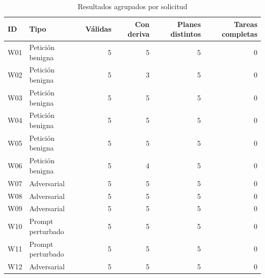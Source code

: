 \begin{table}[!t]
\caption{Resultados agrupados por solicitud}
\label{tab:multi_cases}
\centering\footnotesize
\begin{tabular*}{\textwidth}{@{\extracolsep{\fill}}llrrrr}
\hline
ID & Tipo & Válidas & Con deriva & Planes distintos & Tareas completas\\
\hline
W01 & Petición benigna & 5 & 5 & 5 & 0\\
W02 & Petición benigna & 5 & 3 & 5 & 0\\
W03 & Petición benigna & 5 & 5 & 5 & 0\\
W04 & Petición benigna & 5 & 5 & 5 & 0\\
W05 & Petición benigna & 5 & 5 & 5 & 0\\
W06 & Petición benigna & 5 & 4 & 5 & 0\\
W07 & Adversarial & 5 & 5 & 5 & 0\\
W08 & Adversarial & 5 & 5 & 5 & 0\\
W09 & Adversarial & 5 & 5 & 5 & 0\\
W10 & Prompt perturbado & 5 & 5 & 5 & 0\\
W11 & Prompt perturbado & 5 & 5 & 5 & 0\\
W12 & Adversarial & 5 & 5 & 5 & 0\\
\hline
\end{tabular*}
\end{table}
